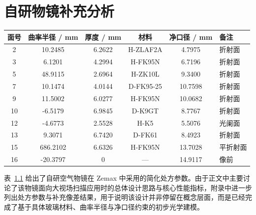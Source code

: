 \thispagestyle{appendixheader}
\renewcommand\thechapter{附录\zhnum{chapter}}
\renewcommand\theequation{\thechapter-\arabic{equation}}

\chapter{自研物镜补充分析}\label{chap:app1}

\begin{table}[htbp]
    \centering
    \label{tab:obj_appendix_prescription}
    \begin{tabular}{c c c c c l}
        \toprule
        面号 & 曲率半径 / mm & 厚度 / mm & 材料 & 净口径 / mm & 备注 \\
        \midrule
        2  & 10.2485  & 6.2622 & H-ZLAF2A  & 4.7975  & 折射面 \\
        3  & 6.1201   & 4.2994 & H-FK95N   & 6.7196  & 折射面 \\
        5  & 48.9115  & 2.6964 & H-ZK10L   & 9.3400  & 折射面 \\
        7  & 10.1474  & 4.0144 & D-FK95-25 & 10.7598 & 折射面 \\
        9  & 11.5002  & 6.0277 & H-FK95N   & 10.0682 & 折射面 \\
        10 & -6.5179  & 6.9845 & D-K9GT    & 8.7767  & 折射面 \\
        12 & -4.6773  & 2.5528 & H-K5      & 5.5076  & 光阑面 \\
        13 & 9.3071   & 6.7420 & D-FK61    & 8.4923  & 折射面 \\
        15 & 686.2102 & 6.6326 & H-FK95N   & 13.7028 & 平折射面 \\
        16 & -20.3797 & 0      & ---       & 14.9117 & 像前 \\
        \bottomrule
    \end{tabular}
\end{table}

表~\ref{tab:obj_appendix_prescription} 给出了自研空气物镜在 Zemax 中采用的简化处方参数。由于正文中主要讨论了该物镜面向大视场扫描应用时的总体设计思路与核心性能指标，附录中进一步列出处方参数与补充像差结果，用于说明该设计并非停留在概念层面，而是已经完成了基于具体玻璃材料、曲率半径与净口径约束的初步光学建模。


